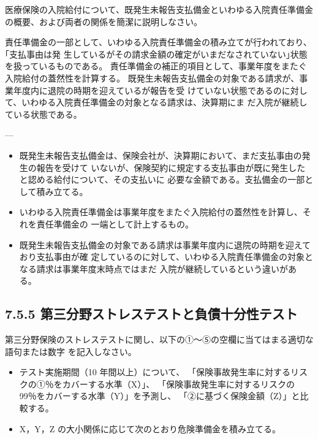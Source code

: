 \documentclass[report,gutter=10mm,fore-edge=10mm,uplatex,dvipdfmx]{jlreq}
\begin{document}

医療保険の入院給付について、既発生未報告支払備金といわゆる入院責任準備金の概要、および両者の関係を簡潔に説明しなさい。

責任準備金の一部として、いわゆる入院責任準備金の積み立てが行われており、｢支払事由は発
生しているがその請求金額の確定がいまだなされていない｣状態を扱っているものである。
責任準備金の補正的項目として、事業年度をまたぐ入院給付の蓋然性を計算する。
既発生未報告支払備金の対象である請求が、事業年度内に退院の時期を迎えているが報告を受
けていない状態であるのに対して、いわゆる入院責任準備金の対象となる請求は、決算期にま
だ入院が継続している状態である。

---
\begin{itemize}
 \item 既発生未報告支払備金は、保険会社が、決算期において、まだ支払事由の発生の報告を受けて
いないが、保険契約に規定する支払事由が既に発生したと認める給付について、その支払いに
必要な金額である。支払備金の一部として積み立てる。
 \item いわゆる入院責任準備金は事業年度をまたぐ入院給付の蓋然性を計算し、それを責任準備金の
一端として計上するもの。
 \item 既発生未報告支払備金の対象である請求は事業年度内に退院の時期を迎えており支払事由が確
定しているのに対して、いわゆる入院責任準備金の対象となる請求は事業年度末時点ではまだ
入院が継続しているという違いがある。
\end{itemize}


\subsection{7.5.5 第三分野ストレステストと負債十分性テスト}
第三分野保険のストレステストに関し、以下の①～⑤の空欄に当てはまる適切な語句または数字
を記入しなさい。
\begin{itemize}
 \item テスト実施期間（10 年間以上）について、
「保険事故発生率に対するリスクの①％をカバーする水準（X）」、
「保険事故発生率に対するリスクの 99％をカバーする水準（Y）」を予測し、
「②に基づく保険金額（Z）」と比較する。
 \item X，Y，Z の大小関係に応じて次のとおり危険準備金を積み立てる。
\end{itemize}
\end{document}

